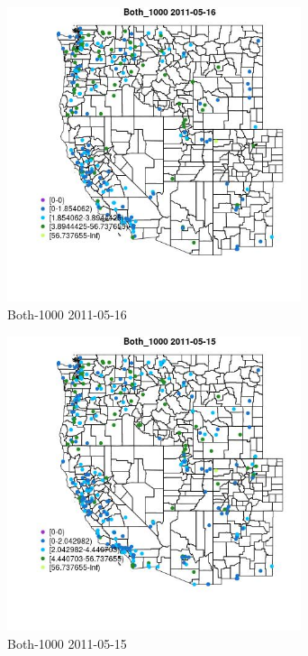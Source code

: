 \begin{figure} 
\centering  
\includegraphics[width=0.77\textwidth]{Code_Outputs/ML_input_report_ML_input_PM25_Step5_part_d_de_duplicated_aves_ML_input_MapObsBoth_10002011-05-16.jpg} 
\caption{\label{fig:ML_input_report_ML_input_PM25_Step5_part_d_de_duplicated_aves_ML_inputMapObsBoth_10002011-05-16}Both-1000 2011-05-16} 
\end{figure} 
 

\begin{figure} 
\centering  
\includegraphics[width=0.77\textwidth]{Code_Outputs/ML_input_report_ML_input_PM25_Step5_part_d_de_duplicated_aves_ML_input_MapObsBoth_10002011-05-15.jpg} 
\caption{\label{fig:ML_input_report_ML_input_PM25_Step5_part_d_de_duplicated_aves_ML_inputMapObsBoth_10002011-05-15}Both-1000 2011-05-15} 
\end{figure} 
 

